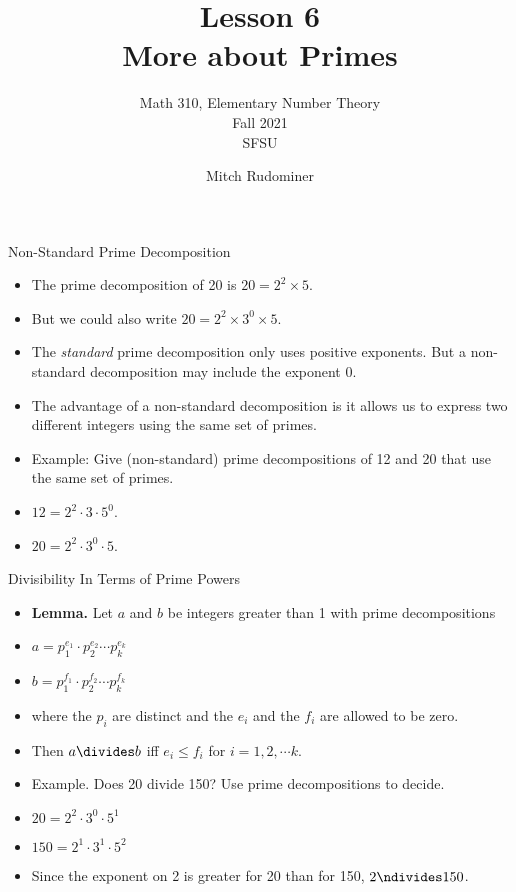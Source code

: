 \documentclass[handout]{beamer}
\title{Lesson 6 \\ More about Primes}
\subtitle{Math 310, Elementary Number Theory \\ Fall 2021 \\ SFSU}
\author{Mitch Rudominer}
\date{}
\begin{document}
\begin{frame}
  \titlepage
\end{frame}


\begin{frame}{Non-Standard Prime Decomposition}

\begin{itemize}
  \item The prime decomposition of 20 is $20 = 2^2 \times 5$.
  \item But we could also write $20 = 2^2 \times 3^0 \times 5$.
  \item The \emph{standard} prime decomposition only uses positive exponents.
  But a non-standard decomposition may include the exponent 0.
  \item The advantage of a non-standard decomposition is it allows us to express
  two different integers using the same set of primes.
  \item Example: Give (non-standard) prime decompositions of 12 and 20 that use the same set of primes.
  \item $12 = 2^2 \cdot 3 \cdot 5^0$.
  \item $20 = 2^2 \cdot 3^0 \cdot 5$.
\end{itemize}

\end{frame}

\begin{frame}{Divisibility In Terms of Prime Powers}

\begin{itemize}
  \item \textbf{Lemma.} Let $a$ and $b$ be integers greater than 1 with prime decompositions
  \item $a=p_1^{e_1} \cdot p_2^{e_2} \cdots p_k^{e_k}$
  \item $b=p_1^{f_1} \cdot p_2^{f_2} \cdots p_k^{f_k}$
  \item where the $p_i$ are distinct and the $e_i$ and the $f_i$ are allowed to be zero.
  \item Then $a\divides b$ iff $e_i \leq f_i$ for $i=1,2,\cdots k$.
  \item Example. Does 20 divide 150? Use prime decompositions to decide.
  \item $20 = 2^2 \cdot 3^0 \cdot 5^1$
  \item $150 = 2^1 \cdot 3^1 \cdot 5^2$
  \item Since the exponent on 2 is greater for 20 than for 150, $2\ndivides 150$.
\end{itemize}

\end{frame}
\end{document}

